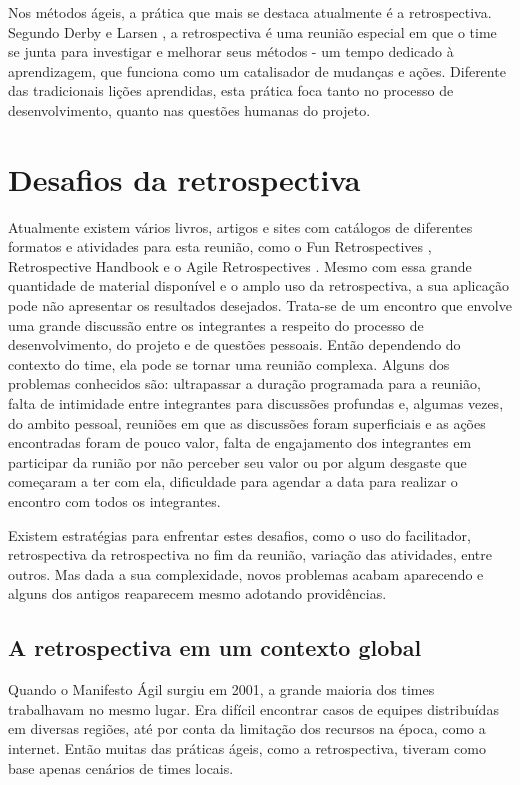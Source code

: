 \documentclass[12pt]{article}
\begin{document}
Nos métodos ágeis, a prática que mais se destaca atualmente é a retrospectiva. Segundo Derby e Larsen \cite{retrospectives:06}, a retrospectiva é uma reunião especial em que o time se junta para investigar e melhorar seus métodos - um tempo dedicado à aprendizagem, que funciona como um catalisador de mudanças e ações. Diferente das tradicionais lições aprendidas, esta prática foca tanto no processo de desenvolvimento, quanto nas questões humanas do projeto.

\section{Desafios da retrospectiva}

Atualmente existem vários livros, artigos e sites com catálogos de diferentes formatos e atividades para esta reunião, como o Fun Retrospectives \cite{fun:14}, Retrospective Handbook \cite{handbook:13} e o Agile Retrospectives \cite{retrospectives:06}. Mesmo com essa grande quantidade de material disponível e o amplo uso da retrospectiva, a sua aplicação pode não apresentar os resultados desejados. Trata-se de um encontro que envolve uma grande discussão entre os integrantes a respeito do processo de desenvolvimento, do projeto e de questões pessoais. Então dependendo do contexto do time, ela pode se tornar uma reunião complexa. Alguns dos problemas conhecidos são: ultrapassar a duração programada para a reunião, falta de intimidade entre integrantes para discussões profundas e, algumas vezes, do ambito pessoal, reuniões em que as discussões foram superficiais e as ações encontradas foram de pouco valor, falta de engajamento dos integrantes em participar da runião por não perceber seu valor ou por algum desgaste que começaram a ter com ela, dificuldade para agendar a data para realizar o encontro com todos os integrantes.

Existem estratégias para enfrentar estes desafios, como o uso do facilitador, retrospectiva da retrospectiva no fim da reunião, variação das atividades, entre outros. Mas dada a sua complexidade, novos problemas acabam aparecendo e alguns dos antigos reaparecem mesmo adotando providências.

\subsection{A retrospectiva em um contexto global}

Quando o Manifesto Ágil \cite{manifesto:01} surgiu em 2001, a grande maioria dos times trabalhavam no mesmo lugar. Era difícil encontrar casos de equipes distribuídas em diversas regiões, até por conta da limitação dos recursos na época, como a internet. Então muitas das práticas ágeis, como a retrospectiva,  tiveram como base apenas cenários de times locais.
  
\end{document}
